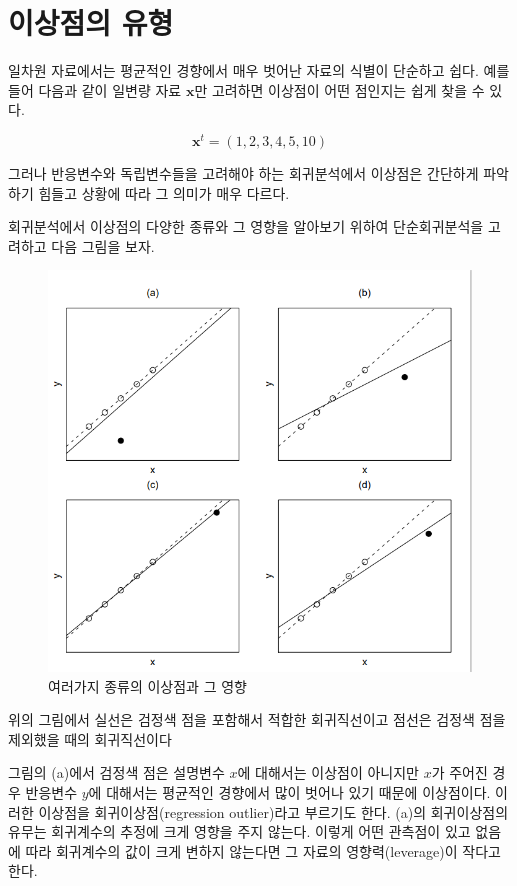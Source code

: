 \documentclass[
]{book}
\theoremstyle{definition}
\theoremstyle{definition}
\theoremstyle{definition}
\theoremstyle{definition}
\theoremstyle{remark}
\begin{document}
\hypertarget{uxc774uxc0c1uxc810uxc758-uxc720uxd615}{%
\section{이상점의 유형}\label{uxc774uxc0c1uxc810uxc758-uxc720uxd615}}

일차원 자료에서는 평균적인 경향에서 매우 벗어난 자료의 식별이 단순하고
쉽다. 예를 들어 다음과 같이 일변량 자료 \(\bm x\)만 고려하면 이상점이 어떤
점인지는 쉽게 찾을 수 있다.

\[ \bm x^t = (1,2,3,4,5,10) \]

그러나 반응변수와 독립변수들을 고려해야 하는 회귀분석에서 이상점은
간단하게 파악하기 힘들고 상황에 따라 그 의미가 매우 다르다.

회귀분석에서 이상점의 다양한 종류와 그 영향을 알아보기 위하여
단순회귀분석을 고려하고 다음 그림을 보자.

\begin{figure}
\centering
\includegraphics{outliers.png}
\caption{여러가지 종류의 이상점과 그 영향}
\end{figure}

위의 그림에서 실선은 검정색 점을 포함해서 적합한 회귀직선이고 점선은
검정색 점을 제외했을 때의 회귀직선이다

그림의 (a)에서 검정색 점은 설명변수 \(x\)에 대해서는 이상점이 아니지만
\(x\)가 주어진 경우 반응변수 \(y\)에 대해서는 평균적인 경향에서 많이 벗어나
있기 때문에 이상점이다. 이러한 이상점을 회귀이상점(regression
outlier)라고 부르기도 한다. (a)의 회귀이상점의 유무는 회귀계수의 추정에
크게 영향을 주지 않는다. 이렇게 어떤 관측점이 있고 없음에 따라
회귀계수의 값이 크게 변하지 않는다면 그 자료의 영향력(leverage)이 작다고
한다.
\end{document}
